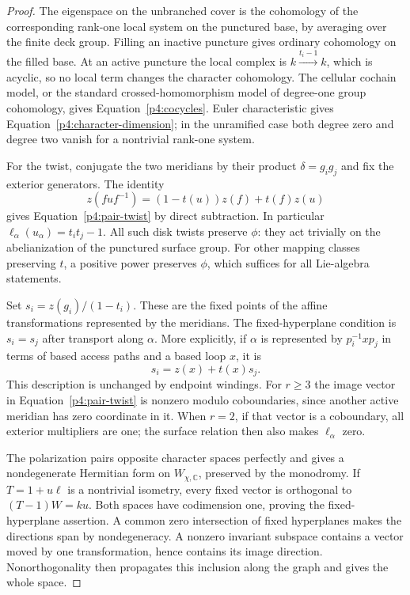 \documentclass[11pt]{article}
\newcommand{\C}{\mathbb C}
\theoremstyle{plain}
\theoremstyle{definition}
\theoremstyle{remark}
\numberwithin{equation}{section}
\begin{document}
\begin{proof}
The eigenspace on the unbranched cover is the cohomology of the
corresponding rank-one local system on the punctured base, by averaging
over the finite deck group.  Filling an inactive puncture gives ordinary
cohomology on the filled base.  At an active puncture the local complex
is $k\xrightarrow{t_i-1}k$, which is acyclic, so no local term changes
the character cohomology.  The cellular cochain model, or the standard
crossed-homomorphism model of degree-one group cohomology, gives
Equation~\eqref{p4:cocycles}.  Euler characteristic gives
Equation~\eqref{p4:character-dimension}; in the unramified case both degree zero
and degree two vanish for a nontrivial rank-one system.

For the twist, conjugate the two meridians by their product
$\delta=g_ig_j$ and fix the exterior generators.  The identity
\[
 z(fuf^{-1})=(1-t(u))z(f)+t(f)z(u)
\]
gives Equation~\eqref{p4:pair-twist} by direct subtraction.  In
particular $\ell_\alpha(u_\alpha)=t_it_j-1$.  All such disk twists
preserve $\phi$: they act trivially on the abelianization of the
punctured surface group.  For other mapping classes preserving $t$, a
positive power preserves $\phi$, which suffices for all Lie-algebra
statements.

Set $s_i=z(g_i)/(1-t_i)$.  These are the fixed points of the affine
transformations represented by the meridians.  The fixed-hyperplane
condition is $s_i=s_j$ after transport along $\alpha$.  More explicitly,
if $\alpha$ is represented by $p_i^{-1}xp_j$ in terms of based access
paths and a based loop $x$, it is
\begin{equation}\label{p4:fixed-points}
 s_i=z(x)+t(x)s_j.
\end{equation}
This description is unchanged by endpoint windings.  For $r\ge3$ the
image vector in Equation~\eqref{p4:pair-twist} is nonzero modulo
coboundaries, since another active meridian has zero coordinate in it.
When $r=2$, if that vector is a coboundary, all exterior multipliers are
one; the surface relation then also makes $\ell_\alpha$ zero.

The polarization pairs opposite character spaces perfectly and gives
a nondegenerate Hermitian form on $W_{\chi,\C}$, preserved by the
monodromy.  If $T=1+u\ell$ is a nontrivial isometry, every fixed vector
is orthogonal to $(T-1)W=ku$.  Both spaces have codimension one, proving
the fixed-hyperplane assertion.  A common zero intersection of fixed
hyperplanes makes the directions span by nondegeneracy.  A nonzero
invariant subspace contains a vector moved by one transformation, hence
contains its image direction.  Nonorthogonality then propagates this
inclusion along the graph and gives the whole space.


\end{proof}
\end{document}
